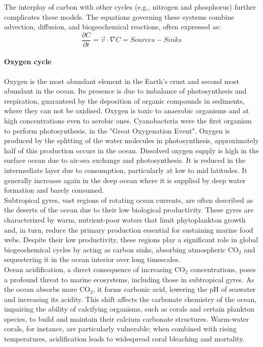 The interplay of carbon with other cycles (e.g., nitrogen and phosphorus) further complicates these models. The equations governing these systems combine advection, diffusion, and biogeochemical reactions, often expressed as:
$$\frac{\partial C}{\partial t}=\vec{v}\cdot \nabla C=Sources-Sinks$$

\paragraph{Oxygen cycle}
Oxygen is the most abundant
element in the Earth’s crust and
second most abundant in the
ocean. Its presence is due to imbalance of
photosynthesis and respiration,
guaranteed by the deposition of
organic compounds in sediments,
where they can not be oxidised. Oxygen is toxic to anaerobic
organisms and at high concentrations even to aerobic ones. Cyanobacteria were the first organism to perform photosynthesis, in the "Great Oxygenation Event". Oxygen is produced by the splitting of the water molecules in photosynthesis, approximately half of this production occurs in the ocean. Dissolved oxygen supply is high
in the surface ocean due to air-sea exchange and
photosynthesis. It is reduced in the intermediate layer due to consumption, particularly at low to mid latitudes. It generally increases again in the deep ocean where it is supplied by deep water
formation and barely consumed.\\
[0.2cm]


Subtropical gyres, vast regions of rotating ocean currents, are often described as the deserts of the ocean due to their low biological productivity. These gyres are characterized by warm, nutrient-poor waters that limit phytoplankton growth and, in turn, reduce the primary production essential for sustaining marine food webs. Despite their low productivity, these regions play a significant role in global biogeochemical cycles by acting as carbon sinks, absorbing atmospheric CO$_2$ and sequestering it in the ocean interior over long timescales.\\

Ocean acidification, a direct consequence of increasing CO$_2$ concentrations, poses a profound threat to marine ecosystems, including those in subtropical gyres. As the ocean absorbs more CO$_2$, it forms carbonic acid, lowering the pH of seawater and increasing its acidity. This shift affects the carbonate chemistry of the ocean, impairing the ability of calcifying organisms, such as corals and certain plankton species, to build and maintain their calcium carbonate structures. Warm-water corals, for instance, are particularly vulnerable; when combined with rising temperatures, acidification leads to widespread coral bleaching and mortality.




